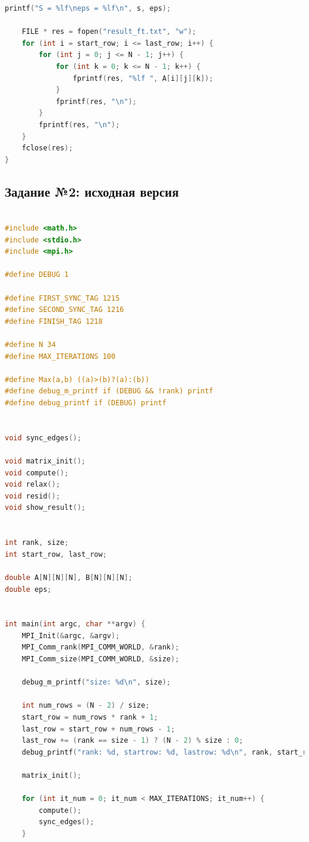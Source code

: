 \documentclass[a4paper]{article}
\begin{document}
\begin{lstlisting}[caption=jac\_3d\_mpi\_ft.c, label={lst:2}, language=C]
    printf("S = %lf\neps = %lf\n", s, eps);

    FILE * res = fopen("result_ft.txt", "w");
    for (int i = start_row; i <= last_row; i++) {
        for (int j = 0; j <= N - 1; j++) {
            for (int k = 0; k <= N - 1; k++) {
                fprintf(res, "%lf ", A[i][j][k]);
            }
            fprintf(res, "\n");
        }
        fprintf(res, "\n");
    }
    fclose(res);
}

\end{lstlisting}

\newpage

\subsection{Задание №2: исходная версия}

\begin{lstlisting}[caption=jac\_3d\_mpi\_noft.c, label={lst:3}, language=C]

#include <math.h>
#include <stdio.h>
#include <mpi.h>

#define DEBUG 1

#define FIRST_SYNC_TAG 1215
#define SECOND_SYNC_TAG 1216
#define FINISH_TAG 1218

#define N 34
#define MAX_ITERATIONS 100

#define Max(a,b) ((a)>(b)?(a):(b))
#define debug_m_printf if (DEBUG && !rank) printf
#define debug_printf if (DEBUG) printf


void sync_edges();

void matrix_init();
void compute();
void relax();
void resid();
void show_result();


int rank, size;
int start_row, last_row;

double A[N][N][N], B[N][N][N];
double eps;


int main(int argc, char **argv) {
    MPI_Init(&argc, &argv);
    MPI_Comm_rank(MPI_COMM_WORLD, &rank);
    MPI_Comm_size(MPI_COMM_WORLD, &size);

    debug_m_printf("size: %d\n", size);

    int num_rows = (N - 2) / size;
    start_row = num_rows * rank + 1;
    last_row = start_row + num_rows - 1;
    last_row += (rank == size - 1) ? (N - 2) % size : 0;
    debug_printf("rank: %d, startrow: %d, lastrow: %d\n", rank, start_row, last_row);

    matrix_init();

    for (int it_num = 0; it_num < MAX_ITERATIONS; it_num++) {
        compute();
        sync_edges();
    }


\end{lstlisting}
\end{document}
